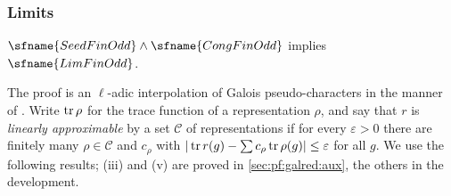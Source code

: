 \subsubsection{Limits}\label{sec:pf:galred:lim}

\begin{theorem}\label{pf:galred:lim}
$\sfname{SeedFinOdd}\wedge\sfname{CongFinOdd}$ implies $\sfname{LimFinOdd}$.
\end{theorem}

The proof is an $\ell$-adic interpolation of Galois pseudo-characters in the manner of \cite{Taylor1991}. Write
$\operatorname{tr}\rho$ for the trace function of a representation $\rho$, and say that $r$ is \emph{linearly approximable} by a set
$\mathcal C$ of representations if for every $\varepsilon>0$ there are finitely many $\rho\in\mathcal C$ and $c_\rho$ with
$|\operatorname{tr} r(g)-\sum c_\rho\operatorname{tr}\rho(g)|\le\varepsilon$ for all $g$. We use the following results; (iii) and (v) are
proved in \cref{sec:pf:galred:aux}, the others in the development.

